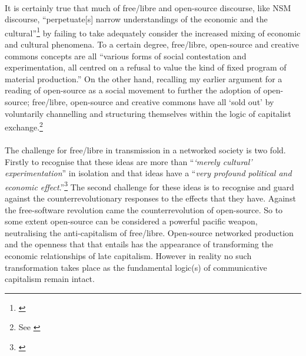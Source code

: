 \paragraph{}It is certainly true that much of free/libre and open-source discourse, like NSM discourse, ``perpetuate[s] narrow understandings of the economic and the cultural''\footnote{\cite[p. 275]{Hardt:2001jl}} by failing to take adequately  consider the increased mixing of economic and cultural phenomena. To a certain degree, free/libre, open-source and creative commons concepts are all ``various forms of social contestation and experimentation, all centred on a refusal to value the kind of fixed program of material production.'' On the other hand, recalling my earlier argument for a reading of open-source as a social movement to further the adoption of open-source; free/libre, open-source and creative commons have all `sold out' by voluntarily channelling and structuring themselves within the logic of capitalist exchange.\footnote{See \cite[p. 80]{Terranova:2004ly}}

\paragraph{}The challenge for free/libre in transmission in a networked society is two fold. Firstly to recognise that these ideas are more than ``\textit{`merely cultural' experimentation}'' in isolation and that ideas have a ``\textit{very profound political and economic effect}.''\footnote{\cite[p. 274, original emphasis]{Hardt:2001jl}} The second challenge for these ideas is to recognise and guard against the counterrevolutionary responses to the effects that they have. Against the free-software revolution came the counterrevolution of open-source. So to some extent open-source can be considered a powerful pacific weapon, neutralising the anti-capitalism of free/libre. Open-source networked production and the openness that that entails has the appearance of transforming the economic relationships of late capitalism. However in reality no such transformation takes place as the fundamental logic(s) of communicative capitalism remain intact.

